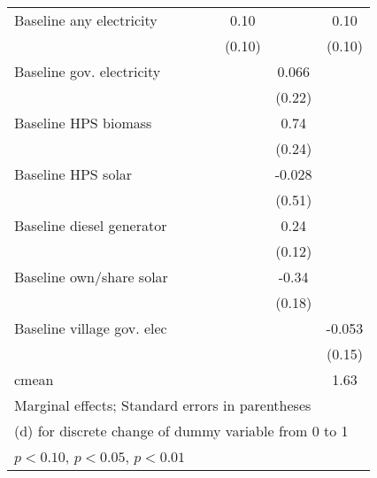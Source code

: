 \begin{table}[htbp]
\begin{tabular*}{1\hsize}{@{\hskip\tabcolsep\extracolsep\fill}l*{6}{c}}
Baseline any electricity&                  &                  &                  &     0.10         &                  &     0.10         \\
                &                  &                  &                  &   (0.10)         &                  &   (0.10)         \\
Baseline gov. electricity&                  &                  &                  &                  &    0.066         &                  \\
                &                  &                  &                  &                  &   (0.22)         &                  \\
Baseline HPS biomass&                  &                  &                  &                  &     0.74\sym{***}&                  \\
                &                  &                  &                  &                  &   (0.24)         &                  \\
Baseline HPS solar&                  &                  &                  &                  &   -0.028         &                  \\
                &                  &                  &                  &                  &   (0.51)         &                  \\
Baseline diesel generator&                  &                  &                  &                  &     0.24\sym{*}  &                  \\
                &                  &                  &                  &                  &   (0.12)         &                  \\
Baseline own/share solar&                  &                  &                  &                  &    -0.34\sym{*}  &                  \\
                &                  &                  &                  &                  &   (0.18)         &                  \\
Baseline village gov. elec&                  &                  &                  &                  &                  &   -0.053         \\
                &                  &                  &                  &                  &                  &   (0.15)         \\
\midrule
cmean           &                  &                  &                  &                  &                  &     1.63         \\
\bottomrule
\multicolumn{7}{l}{\footnotesize Marginal effects; Standard errors in parentheses}\\
\multicolumn{7}{l}{\footnotesize  (d) for discrete change of dummy variable from 0 to 1}\\
\multicolumn{7}{l}{\footnotesize \sym{*} \(p<0.10\), \sym{**} \(p<0.05\), \sym{***} \(p<0.01\)}\\
\end{tabular*}
\end{table}
